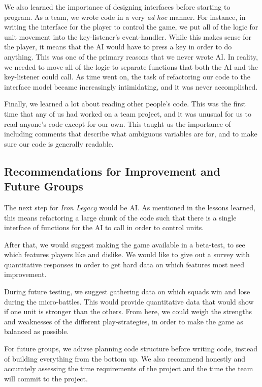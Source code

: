 \documentclass{article}
\begin{document}
We also learned the importance of designing interfaces before starting to
    program.
    As a team, we wrote code in a very \emph{ad hoc} manner.
    For instance, in writing the interface for the player to control the game,
    we put all of the logic for unit movement into the key-listener's
    event-handler.
    While this makes sense for the player, it means that the AI would have
    to press a key in order to do anything.
    This was one of the primary reasons that we never wrote AI.
    In reality, we needed to move all of the logic to separate functions that
    both the AI and the key-listener could call.
    As time went on, the task of refactoring our code to the interface model
    became increasingly intimidating, and it was never accomplished.

Finally, we learned a lot about reading other people's code.
    This was the first time that any of us had worked on a team project,
    and it was unusual for us to read anyone's code except for our own.
    This taught us the importance of including comments that describe what
    ambiguous variables are for, and to make sure our code is generally
    readable.

\subsection*{Recommendations for Improvement and Future Groups}

The next step for \emph{Iron Legacy} would be AI.
    As mentioned in the lessons learned, this means refactoring a large
    chunk of the code such that there is a single interface
    of functions for the AI to call in order to control units.

After that, we would suggest making the game available in a beta-test,
    to see which features players like and dislike.
    We would like to give out a survey with quantitative
    responses in order to get hard data on which features most need
    improvement.

During future testing, we suggest gathering data on which squads
    win and lose during the micro-battles.
    This would provide quantitative data that would show if one unit
    is stronger than the others.
    From here, we could weigh the strengths and
    weaknesses of the different play-strategies, in order to make
    the game as balanced as possible.

For future groups, we adivse planning code structure before writing code,
    instead of building everything from the bottom up. We also recommend
    honestly and accurately assessing the time requirements of the project
    and the time the team will commit to the project.
\clearpage
\end{document}
